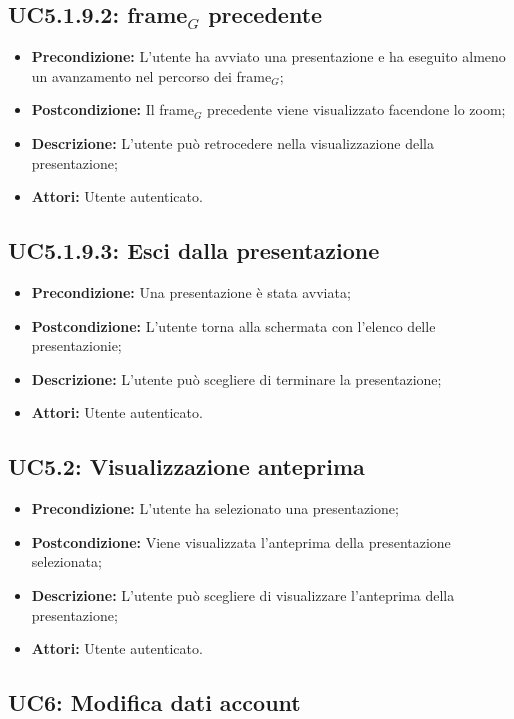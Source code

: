 \subsection{ UC5.1.9.2: frame$_G$ precedente}

\begin{itemize}
	\item \textbf{Precondizione:} L'utente ha avviato una presentazione e ha eseguito almeno un avanzamento nel percorso dei frame$_G$;
	\item \textbf{Postcondizione:} Il frame$_G$ precedente viene visualizzato facendone lo zoom;
	\item \textbf{Descrizione:} L'utente può retrocedere nella visualizzazione della presentazione;
	\item \textbf{Attori:} Utente autenticato.
\end{itemize}
\subsection{ UC5.1.9.3: Esci dalla presentazione }

\begin{itemize}
	\item \textbf{Precondizione:} Una presentazione è stata avviata;
	\item \textbf{Postcondizione:} L'utente torna alla schermata con l'elenco delle presentazionie;
	\item \textbf{Descrizione:} L'utente può scegliere di terminare la presentazione;
	\item \textbf{Attori:} Utente autenticato.
\end{itemize}
\subsection{ UC5.2: Visualizzazione anteprima }

\begin{itemize}
	\item \textbf{Precondizione:} L'utente ha selezionato una presentazione;
	\item \textbf{Postcondizione:} Viene visualizzata l'anteprima della presentazione selezionata;
	\item \textbf{Descrizione:} L'utente può scegliere di visualizzare l'anteprima della presentazione;
	\item \textbf{Attori:} Utente autenticato.
\end{itemize}

\newpage
\subsection{ UC6: Modifica dati account}

